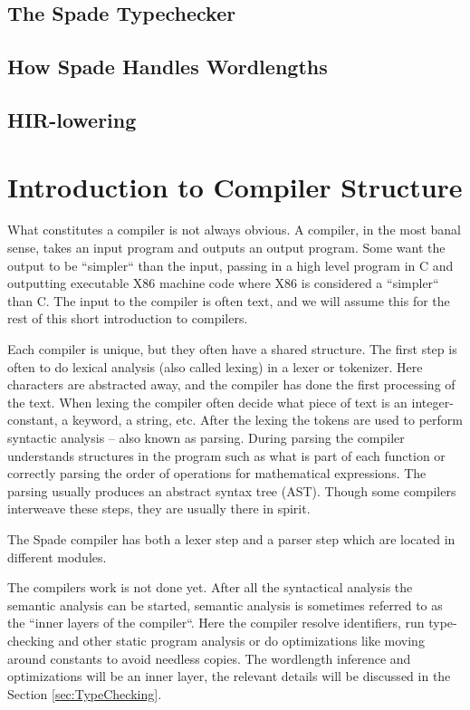 \subsection{The Spade Typechecker}

\subsection{How Spade Handles Wordlengths}
\todo{}

\subsection{HIR-lowering}
\todo{}

\section{Introduction to Compiler Structure}
What constitutes a compiler is not always obvious. A compiler, in the most banal sense, takes an input program and outputs an output program. Some want the output to be ``simpler`` than the input, passing in a high level program in C and outputting executable X86 machine code where X86 is considered a ``simpler`` than C. The input to the compiler is often text, and we will assume this for the rest of this short introduction to compilers.

Each compiler is unique, but they often have a shared structure. The first step is often to do lexical analysis (also called lexing) in a lexer or tokenizer. Here characters are abstracted away, and the compiler has done the first processing of the text. When lexing the compiler often decide what piece of text is an integer-constant, a keyword, a string, etc. After the lexing the tokens are used to perform syntactic analysis -- also known as parsing. During parsing the compiler understands structures in the program such as what is part of each function or correctly parsing the order of operations for mathematical expressions. The parsing usually produces an abstract syntax tree (AST). Though some compilers interweave these steps, they are usually there in spirit.

The Spade compiler has both a lexer step and a parser step which are located in different modules.

The compilers work is not done yet. After all the syntactical analysis the semantic analysis can be started, semantic analysis is sometimes referred to as the ``inner layers of the compiler``. Here the compiler resolve identifiers, run type-checking and other static program analysis or do optimizations like moving around constants to avoid needless copies. The wordlength inference and optimizations will be an inner layer, the relevant details will be discussed in the Section \ref{sec:TypeChecking}. 

